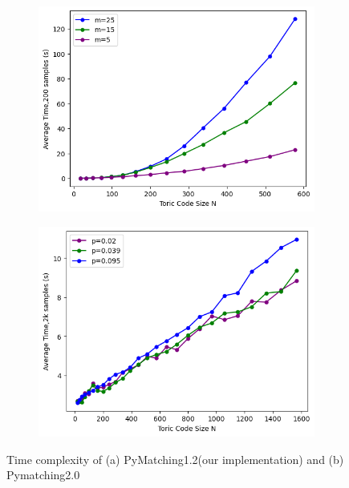\documentclass[
    a4paper, %
    10pt, %
    unnumberedsections, %
    twoside, %
]{LTJournalArticle}
\begin{document}
    \begin{figure}[htbp] %
        \centering %
        \vspace{-1.1cm} %
        \setlength{\abovecaptionskip}{0.cm} %
        \setlength{\belowcaptionskip}{0.cm} %
        \setlength{\belowdisplayskip}{3pt} %
        \begin{subfigure}[b]{0.9\linewidth}
            \includegraphics[width=\linewidth]{img/timespend_ours.png}
            \caption{}
            \label{fig:time1}
        \end{subfigure}
        \hfill
        \begin{subfigure}[b]{0.9\linewidth}
            \includegraphics[width=\linewidth]{img/timespend_pymatch.png}
            \caption{}
            \label{fig:time2}
        \end{subfigure}
        \caption{Time complexity of (a) PyMatching1.2(our implementation) and (b) Pymatching2.0}
    \end{figure}
\end{document}
